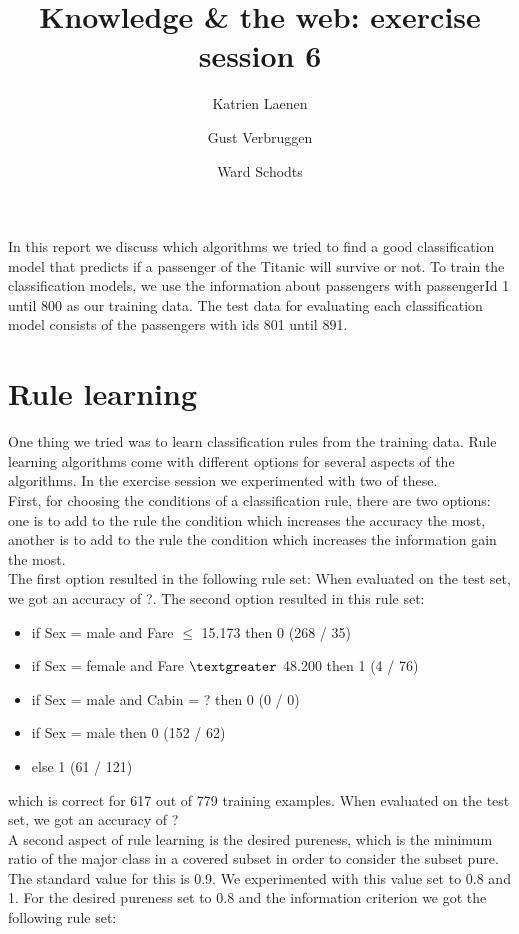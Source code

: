 \documentclass[11pt,a4paper]{article}
\author{
  Katrien Laenen\\
  \and
  Gust Verbruggen\\
  \and
  Ward Schodts
}
\title{Knowledge \& the web: exercise session 6}
\begin{document}
\maketitle
In this report we discuss which algorithms we tried to find a good classification model that predicts if a passenger of the Titanic will survive or not.
To train the classification models, we use the information about passengers with passengerId 1 until 800 as our training data. The test data for evaluating each classification model consists of the passengers with ids 801 until 891. 

\section{Rule learning}
One thing we tried was to learn classification rules from the training data.
Rule learning algorithms come with different options for several aspects of the algorithms. In the exercise session we experimented with two of these.\\
First, for choosing the conditions of a classification rule, there are two options: one is to add to the rule the condition which increases the accuracy the most, another is to add to the rule the condition which increases the information gain the most.\\
The first option resulted in the following rule set:
When evaluated on the test set, we got an accuracy of ?.
The second option resulted in this rule set:
\begin{itemize}

\item if Sex = male and Fare $\leq$ 15.173 then 0  (268 / 35)
\item if Sex = female and Fare $\textgreater$ 48.200 then 1  (4 / 76)
\item if Sex = male and Cabin = ? then 0  (0 / 0)
\item if Sex = male then 0  (152 / 62)
\item else 1  (61 / 121)

\end{itemize}
which is correct for 617 out of 779 training examples.
When evaluated on the test set, we got an accuracy of ?\\
A second aspect of rule learning is the desired pureness, which is the minimum ratio of the major class in a covered subset in order to consider the subset pure. The standard value for this is 0.9. We experimented with this value set to 0.8 and 1.
For the desired pureness set to 0.8 and the information criterion we got the following rule set:
\end{document}
